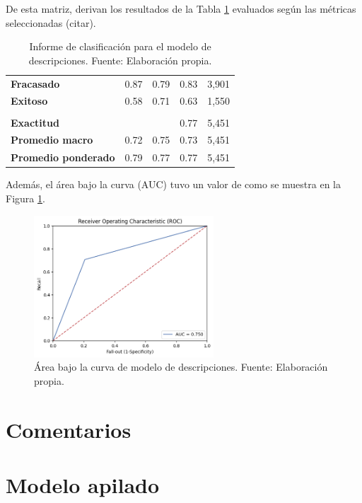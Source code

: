 De esta matriz, derivan los resultados de la Tabla \ref{5:table2} evaluados según las métricas seleccionadas (citar).

\begin{table}[h!]
	\centering
	\small
	\begin{tabular}{ |m{4.5cm}|m{2.5cm}|m{2.5cm}|m{2.5cm}|m{2.5cm}|  }
		\hline
		\rowcolor{bluejean}
		\Centering \color{white}{Valor}& \Centering \color{white}{Precisión}& \Centering \color{white}{Sensibilidad}& \Centering \color{white}{Puntaje F1}& \Centering \color{white}{Muestras}\\
		\hline
		\textbf{Fracasado} & 0.87 & 0.79 & 0.83 & 3,901 \\
		\hline
		\textbf{Exitoso} & 0.58 & 0.71 & 0.63 & 1,550 \\
		\hline
		\rowcolor{turq}
		\multicolumn{5}{c}{ } \\
		\hline
		\textbf{Exactitud} &  &	 & 0.77 & 5,451 \\
		\hline
		\textbf{Promedio macro} & 0.72 & 0.75 & 0.73 & 5,451 \\
		\hline
		\textbf{Promedio ponderado} & 0.79 & 0.77 & 0.77 & 5,451 \\
		\hline
	\end{tabular}
	\caption{Informe de clasificación para el modelo de descripciones. Fuente: Elaboración propia.}
	\label{5:table2}
\end{table}

Además, el área bajo la curva (AUC) tuvo un valor de como se muestra en la Figura \ref{5:fig8}.

\begin{figure}[!ht]
	\begin{center}
		\includegraphics[width=0.60\textwidth]{4/figures/description_auc.png}
		\caption{Área bajo la curva de modelo de descripciones. Fuente: Elaboración propia.}
		\label{5:fig8}
	\end{center}
\end{figure}

\section{Comentarios}

\section{Modelo apilado}